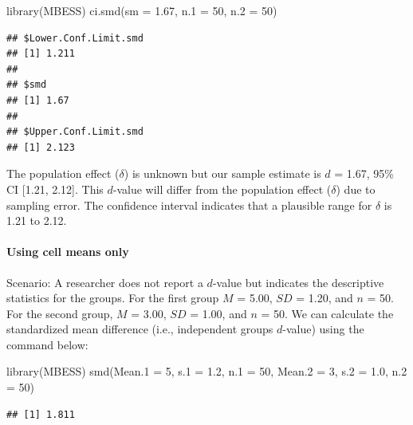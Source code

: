 \documentclass[
]{krantz}
\makeatletter
\newenvironment{Shaded}{\begin{snugshade}}{\end{snugshade}}
\newcommand{\AttributeTok}[1]{\textcolor[rgb]{0.61,0.61,0.61}{#1}}
\newcommand{\DecValTok}[1]{\textcolor[rgb]{0.06,0.06,0.06}{#1}}
\newcommand{\FloatTok}[1]{\textcolor[rgb]{0.06,0.06,0.06}{#1}}
\newcommand{\FunctionTok}[1]{\textcolor[rgb]{0,0,0}{#1}}
\newcommand{\NormalTok}[1]{#1}
\newenvironment{kframe}{%
\medskip{}
\setlength{\fboxsep}{.8em}
 \def\at@end@of@kframe{}%
 \ifinner\ifhmode%
  \def\at@end@of@kframe{\end{minipage}}%
  \begin{minipage}{\columnwidth}%
 \fi\fi%
 \def\FrameCommand##1{\hskip\@totalleftmargin \hskip-\fboxsep
 \colorbox{shadecolor}{##1}\hskip-\fboxsep
     \hskip-\linewidth \hskip-\@totalleftmargin \hskip\columnwidth}%
 \MakeFramed {\advance\hsize-\width
   \@totalleftmargin\z@ \linewidth\hsize
   \@setminipage}}%
 {\par\unskip\endMakeFramed%
 \at@end@of@kframe}
\renewenvironment{Shaded}{\begin{kframe}}{\end{kframe}}
\makeatother
\begin{document}
\begin{Shaded}
\begin{Highlighting}[]
\FunctionTok{library}\NormalTok{(MBESS)}
\FunctionTok{ci.smd}\NormalTok{(}\AttributeTok{sm =} \FloatTok{1.67}\NormalTok{, }\AttributeTok{n.1 =} \DecValTok{50}\NormalTok{, }\AttributeTok{n.2 =} \DecValTok{50}\NormalTok{) }
\end{Highlighting}
\end{Shaded}

\begin{verbatim}
## $Lower.Conf.Limit.smd
## [1] 1.211
## 
## $smd
## [1] 1.67
## 
## $Upper.Conf.Limit.smd
## [1] 2.123
\end{verbatim}

The population effect (\(\delta\)) is unknown but our sample estimate is \(d\) = 1.67, 95\% CI {[}1.21, 2.12{]}. This \(d\)-value will differ from the population effect (\(\delta\)) due to sampling error. The confidence interval indicates that a plausible range for \(\delta\) is 1.21 to 2.12.

\hypertarget{using-cell-means-only}{%
\paragraph{Using cell means only}\label{using-cell-means-only}}

Scenario: A researcher does not report a \(d\)-value but indicates the descriptive statistics for the groups. For the first group \(M\) = 5.00, \(SD\) = 1.20, and \(n\) = 50. For the second group, \(M\) = 3.00, \(SD\) = 1.00, and \(n\) = 50. We can calculate the standardized mean difference (i.e., independent groups \(d\)-value) using the command below:

\begin{Shaded}
\begin{Highlighting}[]
\FunctionTok{library}\NormalTok{(MBESS)}
\FunctionTok{smd}\NormalTok{(}\AttributeTok{Mean.1 =} \DecValTok{5}\NormalTok{,}
    \AttributeTok{s.1 =} \FloatTok{1.2}\NormalTok{, }
    \AttributeTok{n.1 =} \DecValTok{50}\NormalTok{, }
    \AttributeTok{Mean.2 =} \DecValTok{3}\NormalTok{, }
    \AttributeTok{s.2 =} \FloatTok{1.0}\NormalTok{, }
    \AttributeTok{n.2 =} \DecValTok{50}\NormalTok{) }
\end{Highlighting}
\end{Shaded}

\begin{verbatim}
## [1] 1.811
\end{verbatim}
\end{document}
